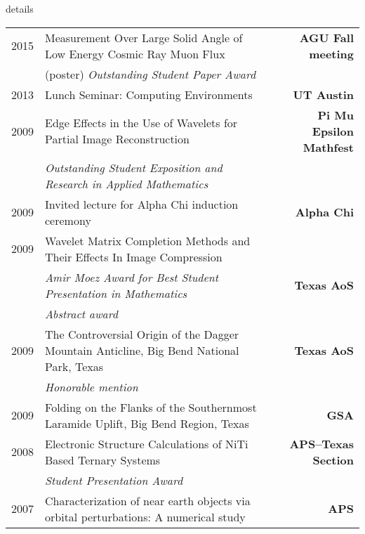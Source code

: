 \documentclass[10pt,letterpaper]{moderncv}
\begin{document}
\begin{taggedblock}{details}
\begin{tabularx}{\textwidth}{p{.33in}X>{\bfseries}r}

	2015 & Measurement Over Large Solid Angle of Low Energy Cosmic Ray Muon Flux &  AGU Fall meeting \\
	 & (poster) \emph{Outstanding Student Paper Award} & \\
	 2013 & Lunch Seminar: Computing Environments & UT Austin \\
	 2009 & Edge Effects in the Use of Wavelets for Partial Image Reconstruction & Pi Mu Epsilon Mathfest \\
	 & \emph{Outstanding Student Exposition and Research in Applied Mathematics} & \\

	 2009 & Invited lecture for Alpha Chi induction ceremony & Alpha Chi  \\

	 2009 & Wavelet Matrix Completion Methods and Their Effects In Image Compression &  \\
	  & \emph{Amir Moez Award for Best Student Presentation in Mathematics} & Texas AoS \\
	  & \emph{Abstract award} & \\

	  2009 & The Controversial Origin of the Dagger Mountain Anticline, Big Bend National Park, Texas &  Texas AoS \\
	  & \emph{Honorable mention} & \\


	  2009 & Folding on the Flanks of the Southernmost Laramide Uplift, Big Bend Region, Texas & GSA \\


	 2008 & Electronic Structure Calculations of NiTi Based Ternary Systems  & APS--Texas Section \\
	 & \emph{Student Presentation Award} & \\

	 2007 & Characterization of near earth objects via orbital perturbations: A numerical study & APS

\end{tabularx}
\end{taggedblock}
\end{document}
